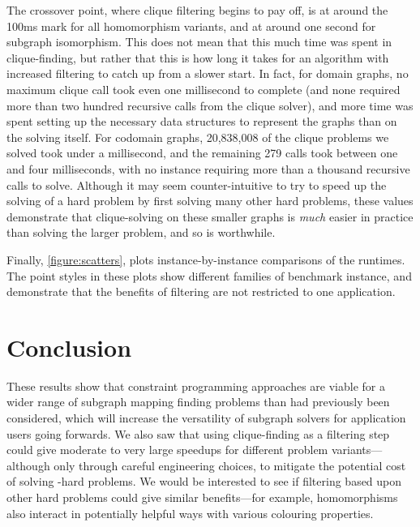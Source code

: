 \documentclass{article}
\begin{document}
The crossover point, where clique filtering begins to pay off, is at around the 100ms mark for all
homomorphism variants, and at around one second for subgraph isomorphism. This does not mean that
this much time was spent in clique-finding, but rather that this is how long it takes for an
algorithm with increased filtering to catch up from a slower start. In fact, for domain graphs, no
maximum clique call took even one millisecond to complete (and none required more than two hundred
recursive calls from the clique solver), and more time was spent setting up the necessary data
structures to represent the graphs than on the solving itself. For codomain graphs, 20,838,008 of
the clique problems we solved took under a millisecond, and the remaining 279 calls took between one
and four milliseconds, with no instance requiring more than a thousand recursive calls to solve.
Although it may seem counter-intuitive to try to speed up the solving of a hard problem by first
solving many other hard problems, these values demonstrate that clique-solving on these smaller
graphs is \emph{much} easier in practice than solving the larger problem, and so is worthwhile.

Finally, \cref{figure:scatters}, plots instance-by-instance comparisons of the runtimes. The
point styles in these plots show different families of benchmark instance, and demonstrate
that the benefits of filtering are not restricted to one application.

\section{Conclusion}

These results show that constraint programming approaches are viable for a wider range of subgraph
mapping finding problems than had previously been considered, which will increase the versatility of
subgraph solvers for application users going forwards. We also saw that using clique-finding as a
filtering step could give moderate to very large speedups for different problem variants---although
only through careful engineering choices, to mitigate the potential cost of solving \NP-hard
problems. We would be interested to see if filtering based upon other hard problems could give
similar benefits---for example, homomorphisms also interact in potentially helpful ways with various
colouring properties.

% 



\end{document}
